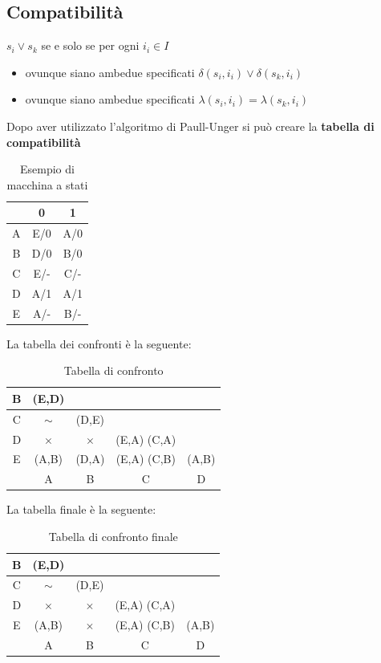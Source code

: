 \documentclass[a4paper]{article}
\theoremstyle{break}
\theoremstyle{break}
\theoremstyle{break}
\theoremstyle{break}
\begin{document}
\subsection{Compatibilità}
\( s_i \vee s_k \) se e solo se per ogni \( i_i \in I \) 
\begin{itemize}
  \item ovunque siano ambedue specificati \( \delta(s_i, i_i) \vee \delta(s_k, i_i) \) 
  \item ovunque siano ambedue specificati \( \lambda(s_i, i_i) = \lambda(s_k, i_i) \) 
\end{itemize}
Dopo aver utilizzato l'algoritmo di Paull-Unger si può creare la \textbf{tabella di compatibilità}
\begin{table}[H]
  \begin{center}
    \begin{tabular}{c|c|c}
      & 0 & 1 \\
      \hline
      A & E/0 & A/0 \\
      B & D/0 & B/0 \\
      C & E/- & C/- \\
      D & A/1 & A/1 \\
      E & A/- & B/- \\
    \end{tabular}
  \end{center}
  \caption{Esempio di macchina a stati}
\end{table}
La tabella dei confronti è la seguente:
\begin{table}[H]
  \begin{center}
    \begin{tabular}{c|c|c|c|c}
      B & (E,D) &  &  &  \\
      \hline
      C & \( \sim\)  & (D,E)  &  &  \\
      \hline
      D & \( \times  \)  & \( \times  \)  & (E,A) (C,A)  &  \\
      \hline
      E & (A,B)  & (D,A)  & (E,A) (C,B)  & (A,B)  \\
      \hline
        & A & B & C & D \\
    \end{tabular}
  \end{center}
  \caption{Tabella di confronto}
\end{table}
La tabella finale è la seguente:
\begin{table}[H]
  \begin{center}
    \begin{tabular}{c|c|c|c|c}
      B & (E,D) &  &  &  \\
      \hline
      C & \( \sim\)  & (D,E)  &  &  \\
      \hline
      D & \( \times  \)  & \( \times  \)  & (E,A) (C,A)  &  \\
      \hline
      E & (A,B)  & \( \times  \)   & (E,A) (C,B)  & (A,B)  \\
      \hline
        & A & B & C & D \\
    \end{tabular}
  \end{center}
  \caption{Tabella di confronto finale}
\end{table}
\end{document}
